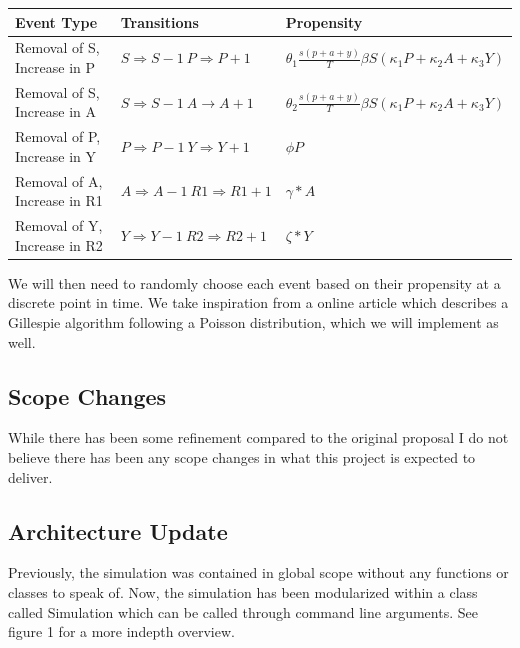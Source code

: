 \documentclass{article}
\begin{document}
\begin{center}
	\begin{tabular}{|l | l | l |}
		\hline
		Event Type                   & Transitions                                    & Propensity                                                                       \\ [0.5ex]
		\hline\hline
		Removal of S, Increase in P  & $S \Rightarrow S - 1 \> P \Rightarrow P + 1$   & $\theta _1 \frac{s(p+a+y)}{T} \beta S (\kappa _1 P + \kappa _2 A + \kappa _3 Y)$ \\
		\hline
		Removal of S, Increase in A  & $S \Rightarrow S - 1 \> A \rightarrow A + 1$   & $ \theta _2 \frac{s(p+a+y)}{T} \beta S (\kappa _1 P + \kappa _2 A+ \kappa _3 Y)$ \\
		\hline

		Removal of P, Increase in Y  & $P \Rightarrow P - 1 \> Y \Rightarrow Y + 1$   & $\phi P$                                                                         \\
		\hline
		Removal of A, Increase in R1 & $A \Rightarrow A - 1 \> R1 \Rightarrow R1 + 1$ & $\gamma * A$                                                                     \\
		\hline
		Removal of Y, Increase in R2 & $Y \Rightarrow Y - 1 \> R2 \Rightarrow R2 + 1$ & $\zeta * Y$                                                                      \\
		\hline
	\end{tabular}
\end{center}

We will then need to randomly choose each event based on their propensity at a discrete point in time. We take inspiration from a online article which describes a Gillespie algorithm following a Poisson distribution, which we will implement as well.
\cite{gillespie}

\subsection{Scope Changes}
While there has been some refinement compared to the original proposal I do not believe there has been any scope changes in what this project is expected to deliver.

\subsection{Architecture Update}
Previously, the simulation was contained in global scope without any functions or classes to speak of. Now, the simulation has been modularized within a class called Simulation which can be called through command line arguments. See figure 1 for a more indepth overview.
\end{document}
